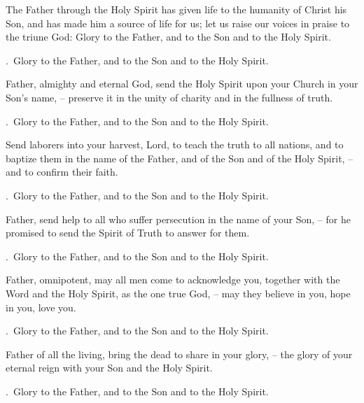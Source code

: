 \lettrine[loversize=0.15,lines=2]{T}{}he Father through the Holy Spirit has given life to the humanity of Christ his Son, and has made him a source of life for us; let us raise our voices in praise to the triune God: Glory to the Father, and to the Son and to the Holy Spirit.
\par \Rbar.~Glory to the Father, and to the Son and to the Holy Spirit.

Father, almighty and eternal God, send the Holy Spirit upon your Church in your Son’s name,
– preserve it in the unity of charity and in the fullness of truth.
\par \Rbar.~Glory to the Father, and to the Son and to the Holy Spirit.

Send laborers into your harvest, Lord, to teach the truth to all nations, and to baptize them in the name of the Father, and of the Son and of the Holy Spirit,
– and to confirm their faith.
\par \Rbar.~Glory to the Father, and to the Son and to the Holy Spirit.

Father, send help to all who suffer persecution in the name of your Son,
– for he promised to send the Spirit of Truth to answer for them.
\par \Rbar.~Glory to the Father, and to the Son and to the Holy Spirit.

Father, omnipotent, may all men come to acknowledge you, together with the Word and the Holy Spirit, as the one true God,
– may they believe in you, hope in you, love you.
\par \Rbar.~Glory to the Father, and to the Son and to the Holy Spirit.

Father of all the living, bring the dead to share in your glory,
– the glory of your eternal reign with your Son and the Holy Spirit.
\par \Rbar.~Glory to the Father, and to the Son and to the Holy Spirit.
